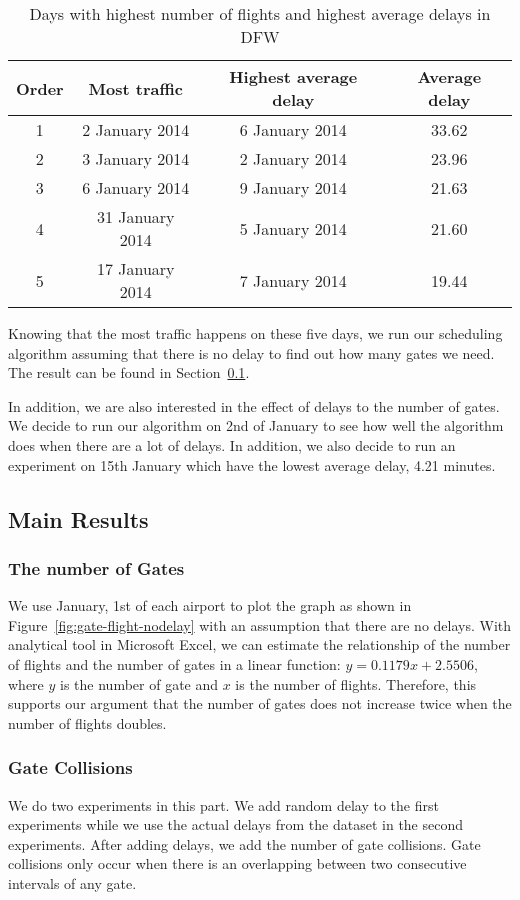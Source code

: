 \documentclass[11pt,a4paper]{article}
\begin{document}
\begin{table}
\caption{Days with highest number of flights and highest average delays in DFW}
\centering
\begin{tabular}{| c | c | c | c |}
\hline
Order & Most traffic & Highest average delay & Average delay \\
\hline
1 & 2 January 2014 & 6 January 2014 & 33.62\\
2 & 3 January 2014 & 2 January 2014 & 23.96\\
3 & 6 January 2014 & 9 January 2014 & 21.63\\
4 & 31 January 2014 & 5 January 2014 & 21.60\\
5 & 17 January 2014 & 7 January 2014 & 19.44\\
\hline
\end{tabular}
\label{table:airport-dfw-delay}
\end{table}

Knowing that the most traffic happens on these five days, we run our scheduling algorithm assuming that there is no delay to find out how many gates we need. The result can be found in Section~\ref{subsec:expo-resu}. \par 
In addition, we are also interested in the effect of delays to the number of gates. We decide to run our algorithm on 2nd of January to see how well the algorithm does when there are a lot of delays. In addition, we also decide to run an experiment on 15th January which have the lowest average delay, 4.21 minutes.

\subsection{Main Results}
\label{subsec:expo-resu}
\subsubsection{The number of Gates} We use January, 1st of each airport to plot the graph as shown in Figure~\ref{fig:gate-flight-nodelay} with an assumption that there are no delays. With analytical tool in Microsoft Excel, we can estimate the relationship of the number of flights and the number of gates in a linear function: $y = 0.1179x + 2.5506$, where $y$ is the number of gate and $x$ is the number of flights. Therefore, this supports our argument that the number of gates does not increase twice when the number of flights doubles.

\subsubsection{Gate Collisions} We do two experiments in this part. We add random delay to the first experiments while we use the actual delays from the dataset in the second experiments. After adding delays, we add the number of gate collisions. Gate collisions only occur when there is an overlapping between two consecutive intervals of any gate.
\end{document}
